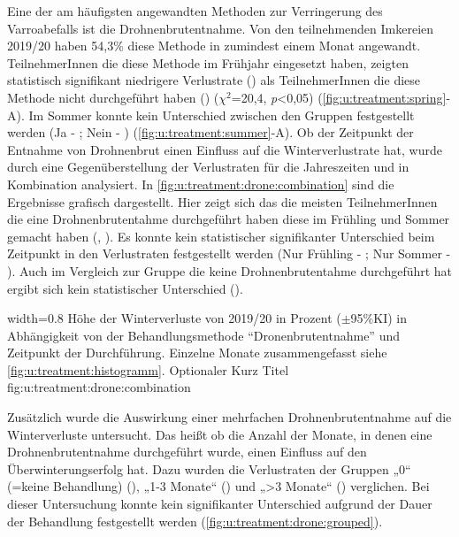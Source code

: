Eine der am häufigsten angewandten Methoden zur Verringerung des Varroabefalls ist die Drohnenbrutentnahme. Von den teilnehmenden Imkereien 2019/20 haben 54,3\% diese Methode in zumindest einem Monat angewandt. TeilnehmerInnen die diese Methode im Frühjahr eingesetzt haben, zeigten statistisch signifikant niedrigere Verlustrate () als TeilnehmerInnen die diese Methode nicht durchgeführt haben () ($\chi^{2}$=20,4, \textit{p}<0,05) (\cref{fig:u:treatment:spring}-A). Im Sommer konnte kein Unterschied zwischen den Gruppen festgestellt werden (Ja - ; Nein - ) (\cref{fig:u:treatment:summer}-A).
\newline
Ob der Zeitpunkt der Entnahme von Drohnenbrut einen Einfluss auf die Winterverlustrate hat, wurde durch eine Gegenüberstellung der Verlustraten für die Jahreszeiten und in Kombination analysiert. In \cref{fig:u:treatment:drone:combination} sind die Ergebnisse grafisch dargestellt. Hier zeigt sich das die meisten TeilnehmerInnen die eine Drohnenbrutentahme durchgeführt haben diese im Frühling und Sommer gemacht haben (, ). Es konnte kein statistischer signifikanter Unterschied beim Zeitpunkt in den Verlustraten festgestellt werden (Nur Frühling - ; Nur Sommer - ). Auch im Vergleich zur Gruppe die keine Drohnenbrutentahme durchgeführt hat ergibt sich kein statistischer Unterschied (). 

{width=0.8\textwidth} %
{Höhe der Winterverluste von 2019/20 in Prozent ($\pm$95\%KI) in Abhängigkeit von der Behandlungsmethode \enquote{Dronenbrutentnahme} und Zeitpunkt der Durchführung. Einzelne Monate zusammengefasst siehe \cref{fig:u:treatment:histogramm}.} %
{Optionaler Kurz Titel} %
{fig:u:treatment:drone:combination} %

Zusätzlich wurde die Auswirkung einer mehrfachen Drohnenbrutentnahme auf die Winterverluste untersucht. Das heißt ob die Anzahl der Monate, in denen eine Drohnenbrutentnahme durchgeführt wurde, einen Einfluss auf den Überwinterungserfolg hat. Dazu wurden die Verlustraten der Gruppen „0`` (=keine Behandlung) (), „1-3 Monate`` () und „>3 Monate`` () verglichen. Bei dieser Untersuchung konnte kein signifikanter Unterschied aufgrund der Dauer der Behandlung festgestellt werden (\cref{fig:u:treatment:drone:grouped}). 

